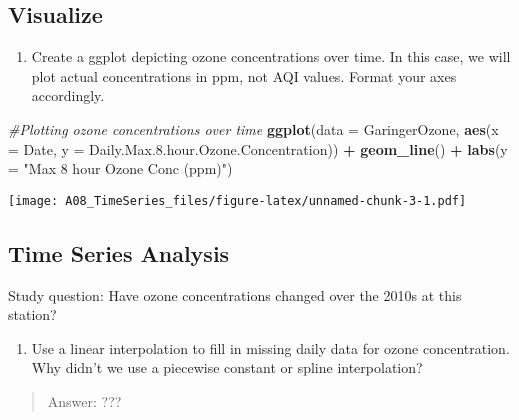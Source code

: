 \documentclass[]{article}
\newenvironment{Shaded}{\begin{snugshade}}{\end{snugshade}}
\newcommand{\CommentTok}[1]{\textcolor[rgb]{0.56,0.35,0.01}{\textit{#1}}}
\newcommand{\DataTypeTok}[1]{\textcolor[rgb]{0.13,0.29,0.53}{#1}}
\newcommand{\FloatTok}[1]{\textcolor[rgb]{0.00,0.00,0.81}{#1}}
\newcommand{\KeywordTok}[1]{\textcolor[rgb]{0.13,0.29,0.53}{\textbf{#1}}}
\newcommand{\NormalTok}[1]{#1}
\newcommand{\OperatorTok}[1]{\textcolor[rgb]{0.81,0.36,0.00}{\textbf{#1}}}
\newcommand{\StringTok}[1]{\textcolor[rgb]{0.31,0.60,0.02}{#1}}
\providecommand{\tightlist}{%
  \setlength{\itemsep}{0pt}\setlength{\parskip}{0pt}}
\begin{document}
\hypertarget{visualize}{%
\subsection{Visualize}\label{visualize}}

\begin{enumerate}
\def\labelenumi{\arabic{enumi}.}
\setcounter{enumi}{6}
\tightlist
\item
  Create a ggplot depicting ozone concentrations over time. In this
  case, we will plot actual concentrations in ppm, not AQI values.
  Format your axes accordingly.
\end{enumerate}

\begin{Shaded}
\begin{Highlighting}[]
\CommentTok{#Plotting ozone concentrations over time}
\KeywordTok{ggplot}\NormalTok{(}\DataTypeTok{data =}\NormalTok{ GaringerOzone, }
       \KeywordTok{aes}\NormalTok{(}\DataTypeTok{x =}\NormalTok{ Date, }\DataTypeTok{y =}\NormalTok{ Daily.Max.}\FloatTok{8.}\NormalTok{hour.Ozone.Concentration)) }\OperatorTok{+}
\StringTok{  }\KeywordTok{geom_line}\NormalTok{() }\OperatorTok{+}
\StringTok{  }\KeywordTok{labs}\NormalTok{(}\DataTypeTok{y =} \StringTok{"Max 8 hour Ozone Conc (ppm)"}\NormalTok{)}
\end{Highlighting}
\end{Shaded}

\texttt{[image: A08\_TimeSeries\_files/figure-latex/unnamed-chunk-3-1.pdf]}

\hypertarget{time-series-analysis}{%
\subsection{Time Series Analysis}\label{time-series-analysis}}

Study question: Have ozone concentrations changed over the 2010s at this
station?

\begin{enumerate}
\def\labelenumi{\arabic{enumi}.}
\setcounter{enumi}{7}
\tightlist
\item
  Use a linear interpolation to fill in missing daily data for ozone
  concentration. Why didn't we use a piecewise constant or spline
  interpolation?
\end{enumerate}

\begin{quote}
Answer: ???
\end{quote}
\end{document}

